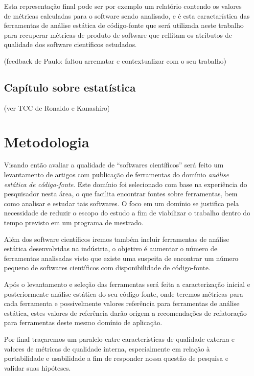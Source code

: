 \documentclass[qual, classic, a4paper]{ufbathesis}
\begin{document}
Esta representação final pode ser por exemplo um relatório contendo os valores
de métricas calculadas para o software sendo analisado, e é esta
caractarística das ferramentas de análise estática de código-fonte que será
utilizada neste trabalho para recuperar métricas de produto de software que
reflitam os atributos de qualidade dos software científicos estudados.

(feedback de Paulo: faltou arrematar e contextualizar com o seu trabalho)

\section{Capítulo sobre estatística}\label{estatistica}

(ver TCC de Ronaldo e Kanashiro)

\chapter{Metodologia}

Visando então avaliar a qualidade de ``softwares científicos'' será feito um
levantamento de artigos com publicação de ferramentas do domínio {\it análise
estática de código-fonte}. Este domínio foi selecionado com base na
experiência do pesquisador nesta área, o que facilita encontrar fontes sobre
ferramentas, bem como analisar e estudar tais softwares. O foco em um domínio
se justifica pela necessidade de reduzir o escopo do estudo a fim de
viabilizar o trabalho dentro do tempo previsto em um programa de mestrado.

Além dos software científicos iremos também incluir ferramentas de análise
estática desenvolvidas na indústria, o objetivo é aumentar o número de
ferramentas analisadas visto que existe uma suspeita de encontrar um número
pequeno de softwares científicos com disponibilidade de código-fonte.

Após o levantamento e seleção das ferramentas será feita a caracterização
inicial e posteriormente análise estática do seu código-fonte, onde teremos
métricas para cada ferramenta e possivelmente valores referência para
ferramentas de análise estática, estes valores de referência darão origem a
recomendações de refatoração para ferramentas deste mesmo domínio de
aplicação.

Por final traçaremos um paralelo entre caracteristicas de qualidade externa e
valores de métricas de qualidade interna, especialmente em relação à
portabilidade e usabilidade a fim de responder nossa questão de pesquisa
e validar suas hipóteses.
\end{document}
